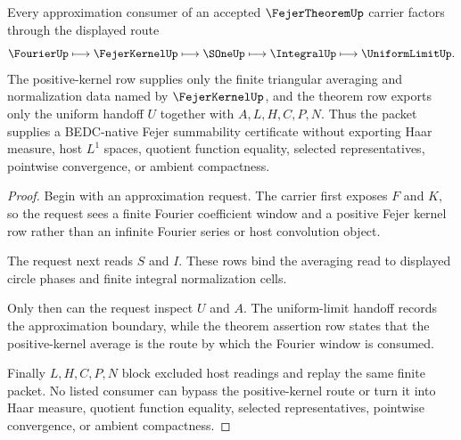 \begin{theorem}
\label{thm:fejer-theorem-positive-kernel-uniform-handoff}
Every approximation consumer of an accepted $\FejerTheoremUp$ carrier factors through the displayed route
$$
\FourierUp \longmapsto \FejerKernelUp \longmapsto \SOneUp \longmapsto \IntegralUp \longmapsto \UniformLimitUp .
$$
The positive-kernel row supplies only the finite triangular averaging and normalization data named by $\FejerKernelUp$, and the theorem row exports only the uniform handoff $U$ together with $A,L,H,C,P,N$. Thus the packet supplies a BEDC-native Fejer summability certificate without exporting Haar measure, host $L^{1}$ spaces, quotient function equality, selected representatives, pointwise convergence, or ambient compactness.
\end{theorem}
\begin{proof}
Begin with an approximation request. The carrier first exposes $F$ and $K$, so the request sees a finite Fourier coefficient window and a positive Fejer kernel row rather than an infinite Fourier series or host convolution object.

The request next reads $S$ and $I$. These rows bind the averaging read to displayed circle phases and finite integral normalization cells.

Only then can the request inspect $U$ and $A$. The uniform-limit handoff records the approximation boundary, while the theorem assertion row states that the positive-kernel average is the route by which the Fourier window is consumed.

Finally $L,H,C,P,N$ block excluded host readings and replay the same finite packet. No listed consumer can bypass the positive-kernel route or turn it into Haar measure, quotient function equality, selected representatives, pointwise convergence, or ambient compactness.
\end{proof}



